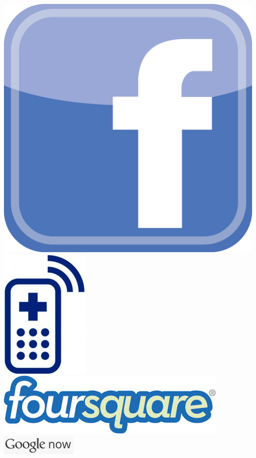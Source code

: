 \documentclass[a2,landscape]{a0poster}
\begin{document}
\begin{itemize}
\begin{center}
	\includegraphics[scale=0.3]{plots/logo_facebook}
	\includegraphics[scale=0.4]{plots/logo_mhealth}\\
	\includegraphics[scale=0.4]{plots/logo_foursquare}
	\includegraphics[scale=1.2]{plots/logo_google_now}
\end{center}
	

\end{itemize}
\end{document}
